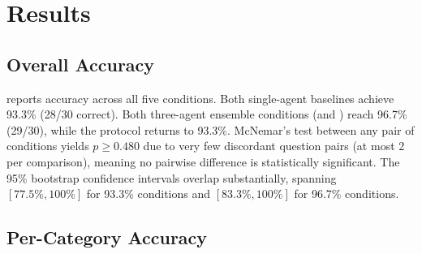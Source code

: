 \section{Results}
\label{sec:results}

\subsection{Overall Accuracy}

 reports accuracy across all five conditions.
Both single-agent baselines achieve 93.3\% (28/30 correct).
Both three-agent ensemble conditions (\homoghaiku and \hetero) reach 96.7\% (29/30),
while the \debate protocol returns to 93.3\%.
McNemar's test between any pair of conditions yields $p \geq 0.480$
due to very few discordant question pairs (at most 2 per comparison),
meaning no pairwise difference is statistically significant.
The 95\% bootstrap confidence intervals overlap substantially, spanning
$[77.5\%, 100\%]$ for 93.3\% conditions and $[83.3\%, 100\%]$ for 96.7\% conditions.

\begin{table}[t]
\centering
\caption{Overall accuracy across five conditions on \advbench (30 questions).
Best results in \textbf{bold}. CI = 95\% bootstrap confidence interval (1000 resamples).
McNemar $p$-values against \singlehaiku shown in parentheses.}
\label{tab:main_results}
\end{table}

\subsection{Per-Category Accuracy}
\label{sec:per_category}

